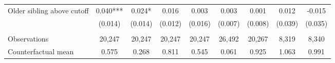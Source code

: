 {{\begin{tabular}{lcccccccc}
Older sibling above cutoff&       0.040***&       0.024*  &       0.016   &       0.003   &       0.003   &       0.001   &       0.012   &      -0.015   \\
                    &     (0.014)   &     (0.014)   &     (0.012)   &     (0.016)   &     (0.007)   &     (0.008)   &     (0.039)   &     (0.035)   \\
                    &               &               &               &               &               &               &               &               \\
Observations        &      20,247   &      20,247   &      20,247   &      20,247   &      26,492   &      20,267   &       8,319   &       8,340   \\
Counterfactual mean &       0.575   &       0.268   &       0.811   &       0.545   &       0.061   &       0.925   &       1.063   &       0.991   \\
 

\bottomrule
\end{tabular}
}
}
